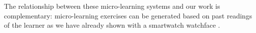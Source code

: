 The relationship between these micro-learning systems and our work is complementary: micro-learning exercises can be generated based on past readings of the learner as we have already shown with a smartwatch watchface \cite{Nien16-time}.
















